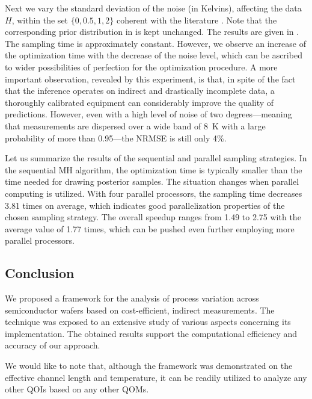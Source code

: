 Next we vary the standard deviation of the noise (in Kelvins), affecting the
data $H$, within the set $\{ 0, 0.5, 1, 2 \}$ coherent with the literature
\cite{mesa-martinez2007}. Note that the corresponding prior distribution in
 is kept unchanged. The results are given in
. The sampling time is approximately constant. However, we
observe an increase of the optimization time with the decrease of the noise
level, which can be ascribed to wider possibilities of perfection for the
optimization procedure. A more important observation, revealed by this
experiment, is that, in spite of the fact that the inference operates on
indirect and drastically incomplete data, a thoroughly calibrated equipment can
considerably improve the quality of predictions. However, even with a high level
of noise of two degrees---meaning that measurements are dispersed over a wide
band of 8~K with a large probability of more than 0.95---the NRMSE is still only
4\%.

Let us summarize the results of the sequential and parallel sampling strategies.
In the sequential MH algorithm, the optimization time is typically smaller than
the time needed for drawing posterior samples. The situation changes when
parallel computing is utilized. With four parallel processors, the sampling time
decreases 3.81 times on average, which indicates good parallelization properties
of the chosen sampling strategy. The overall speedup ranges from 1.49 to 2.75
with the average value of 1.77 times, which can be pushed even further employing
more parallel processors.

\subsection{Conclusion}

We proposed a framework for the analysis of process variation across
semiconductor wafers based on cost-efficient, indirect measurements. The
technique was exposed to an extensive study of various aspects concerning its
implementation. The obtained results support the computational efficiency and
accuracy of our approach.

We would like to note that, although the framework was demonstrated on the
effective channel length and temperature, it can be readily utilized to analyze
any other \acp{QOI} based on any other \acp{QOM}.
